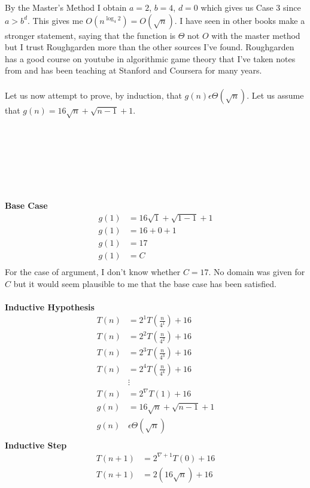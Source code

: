 \documentclass[paper=a4,fontsize=11pt]{article}
\begin{document}
\begin{enumerate}
\begin{enumerate}
By the Master's Method I obtain $a = 2$, $b = 4$, $d = 0$ which gives us Case 3 since $a > b^d$. This gives me $O(n^{\log_4{2}}) = O(\sqrt{n})$. I have seen in other books make a stronger statement, saying that the function is $\Theta$ not $O$ with the master method but I trust Roughgarden more than the other sources I've found. Roughgarden has a good course on youtube in algorithmic game theory that I've taken notes from and has been teaching at Stanford and Coursera for many years.\\\\
Let us now attempt to prove, by induction, that $g(n) \epsilon \Theta(\sqrt{n})$. Let us assume that $g(n) = 16\sqrt{n} + \sqrt{n - 1} + 1$.\\\\\\\\\\\\\\\\
\textbf{Base Case}
\begin{align*}
g(1) &= 16\sqrt{1} + \sqrt{1 - 1} + 1\\
g(1) &= 16 + 0 + 1\\
g(1) &= 17\\
g(1) &= C\\
\end{align*}
For the case of argument, I don't know whether $C=17$. No domain was given for $C$ but it would seem plausible to me that the base case has been satisfied.\\\\
\textbf{Inductive Hypothesis}
\begin{align*}
T(n) &= 2^{1}T(\frac{n}{4^{1}}) + 16\\
T(n) &= 2^{2}T(\frac{n}{4^{2}}) + 16\\
T(n) &= 2^{3}T(\frac{n}{4^{3}}) + 16\\
T(n) &= 2^{4}T(\frac{n}{4^{4}}) + 16\\
&\vdots\\
T(n) &= 2^{\nabla}T(1) + 16\\
g(n) &= 16\sqrt{n} + \sqrt{n - 1} + 1\\
g(n) &\epsilon \Theta(\sqrt{n})\\
\end{align*}
\textbf{Inductive Step}
\begin{align*}
T(n + 1) &= 2^{\nabla+1}T(0) + 16\\
T(n + 1) &= 2(16\sqrt{n}) + 16\\

\end{align*}
\end{enumerate}
\end{enumerate}
\end{document}
